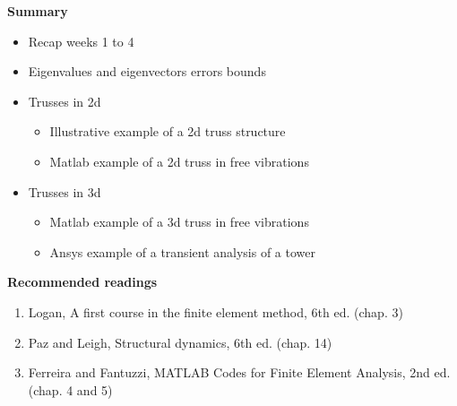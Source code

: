 \documentclass[aspectratio=169]{beamer}
\begin{document}
{  \begin{frame}
    \textbf{\large Summary}
    \begin{itemize}
      \item Recap weeks 1 to 4
      \item Eigenvalues and eigenvectors errors bounds
      \item Trusses in 2d
            \begin{itemize}
              \item Illustrative example of a 2d truss structure
              \item Matlab example of a 2d truss in free vibrations
            \end{itemize}
      \item Trusses in 3d
            \begin{itemize}
              \item Matlab example of a 3d truss in free vibrations
              \item Ansys example of a transient analysis of a tower
            \end{itemize}
    \end{itemize}
    \vspace{.5cm}

    \textbf{\large Recommended readings}
    \begin{enumerate}
      \item Logan, A first course in the finite element method, 6th ed.
            (chap. 3)
      \item Paz and Leigh, Structural dynamics, 6th ed. (chap. 14)
      \item Ferreira and Fantuzzi, MATLAB Codes for Finite Element Analysis, 2nd ed. (chap. 4 and 5)
    \end{enumerate}
  \end{frame}
}
\end{document}
